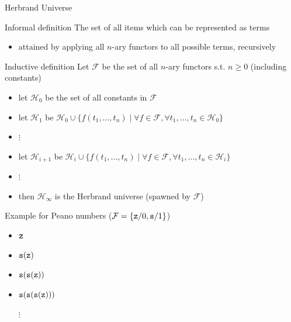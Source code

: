 \documentclass[presentation]{beamer}\mode<presentation>{\usetheme{AMSBolognaFC}}
\begin{document}
\begin{frame}[allowframebreaks]{Herbrand Universe}
    \begin{block}{Informal definition}
        The set of all items which can be represented as terms
        \begin{itemize}
            \item attained by applying all $n$-ary functors to all possible terms, recursively
        \end{itemize}
    \end{block}

    \begin{alertblock}{Inductive definition}\label{slide:herbrand}
        Let $\mathcal{F}$ be the set of all $n$-ary functors s.t. $n \geq 0$ (including constants)
        \begin{itemize}
            \item let $\mathcal{H}_0$ be the set of all constants in $\mathcal{F}$
            \item let $\mathcal{H}_1$ be $\mathcal{H}_0 \cup \{ f(t_1, \ldots, t_n) \mid \forall f \in \mathcal{F}, \forall t_1, \ldots, t_n \in \mathcal{H}_0 \}$
            \item $\vdots$
            \item let $\mathcal{H}_{i+1}$ be $\mathcal{H}_i \cup \{ f(t_1, \ldots, t_n) \mid \forall f \in \mathcal{F}, \forall t_1, \ldots, t_n \in \mathcal{H}_i \}$
            \item $\vdots$
            \item then $\mathcal{H}_\infty$ is the Herbrand universe (spawned by $\mathcal{F}$)
        \end{itemize}
    \end{alertblock}

    \framebreak

    \begin{exampleblock}{Example for Peano numbers ($\mathcal{F} = \{ \mathtt{z}/0, \mathtt{s}/1 \}$)}
        \begin{itemize}
            \item $\mathtt{z}$
            \item $\mathtt{s}(\mathtt{z})$
            \item $\mathtt{s}(\mathtt{s}(\mathtt{z}))$
            \item $\mathtt{s}(\mathtt{s}(\mathtt{s}(\mathtt{z})))$
            \item[$\vdots$]
        \end{itemize}
    \end{exampleblock}


\end{frame}
\end{document}
